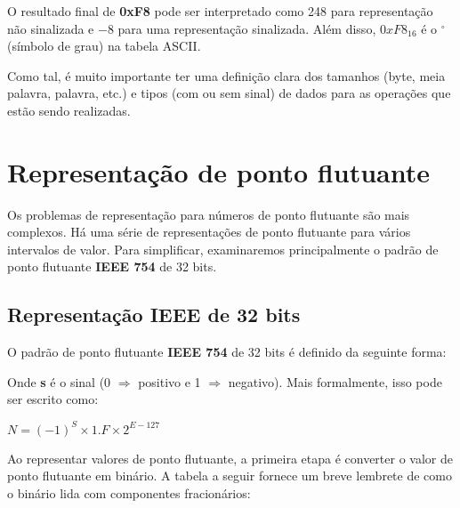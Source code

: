 \vspace{5mm}

O resultado final de \textbf{0xF8} pode ser interpretado como 248 para representação não sinalizada e $ -8 $ para uma representação sinalizada. Além disso, $ 0xF8_{16} $ é o $^{\circ}$ (símbolo de grau) na tabela ASCII.

Como tal, é muito importante ter uma definição clara dos tamanhos (byte, meia palavra, palavra, etc.) e tipos (com ou sem sinal) de dados para as operações que estão sendo realizadas.

\section{Representação de ponto flutuante}
Os problemas de representação para números de ponto flutuante são mais complexos. Há uma série de representações de ponto flutuante para vários intervalos de valor. Para simplificar, examinaremos principalmente o padrão de ponto flutuante \textbf{IEEE 754} de 32 bits.

\subsection{Representação IEEE de 32 bits}
O padrão de ponto flutuante\textbf{ IEEE 754} de 32 bits é definido da seguinte forma:

\noindent
{}

Onde \textbf{s} é o sinal (0 $\Rightarrow $ positivo e 1 $ \Rightarrow $  negativo). Mais formalmente, isso pode ser escrito como:
\begin{center}
	$ N = (−1)^S \times 1.F \times 2^{E-127} $
\end{center}

Ao representar valores de ponto flutuante, a primeira etapa é converter o valor de ponto flutuante em binário. A tabela a seguir fornece um breve lembrete de como o binário lida com componentes fracionários:

